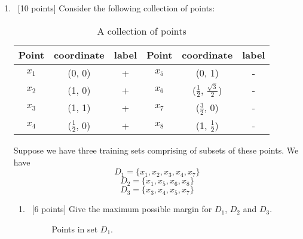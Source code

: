 \begin{enumerate}
\item ~[10 points]  Consider the following collection of points:
  \begin{table}[H]
    \centering
    \begin{tabular}{| c | c | c  ||  c | c | c |}
      \hline
      Point & coordinate  & label & Point & coordinate  & label \\
      \hline
      $x_1$ & (0, 0)             & + & $x_5$ & (0, 1)                                & - \\
      $x_2$ & (1, 0)             & + & $x_6$ & ($\frac{1}{2}$, $\frac{\sqrt{3}}{2}$) & - \\
      $x_3$ & (1, 1)             & + & $x_7$ & ($\frac{3}{2}$, 0)                    & - \\
      $x_4$ & ($\frac{1}{2}$, 0) & + & $x_8$ & (1, $\frac{1}{2}$)                    & - \\
      \hline
    \end{tabular}
    \caption{A collection of points}
  \end{table}

  Suppose we have three training sets comprising of subsets of these
  points. We have
  $$D_1 = \{x_1, x_2, x_3, x_4, x_7\}$$
  $$D_2 = \{x_1, x_5, x_6, x_8\}$$
  $$D_3 = \{x_3, x_4, x_5, x_ 7\}$$

  \begin{enumerate}
  \item ~[6 points] Give the maximum possible margin for $D_1$, $D_2$
    and $D_3$.
   
   \begin{figure}[H]
    \centering
    \caption{Points in set $D_1$.} \label{SetD1}
  \end{figure}   


\end{enumerate}
\end{enumerate}
